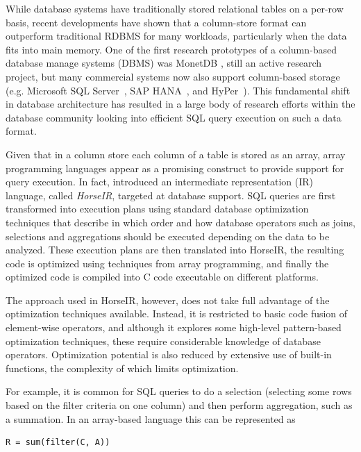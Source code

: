 While database systems have traditionally stored relational tables on a per-row
basis, recent developments have shown that a column-store format can outperform
traditional RDBMS for many workloads, particularly when the data fits into
main memory.
One of the first research prototypes of a column-based database manage systems
(DBMS) was MonetDB \cite{IdreosS2012}, still an active research project, but
many commercial systems now also support column-based storage (e.g.
Microsoft SQL Server~\cite{msqlserver},
SAP HANA~\cite{FarberF2012}, and
HyPer~\cite{Neumann2011:HyPer}).
This fundamental shift in database architecture has resulted in a large body of
research efforts within the database community looking into efficient SQL query
execution on such a data format.

Given that in a column store each column of a table is stored as an array,
array programming languages appear as a promising construct to provide support
for query execution. In fact, \OldPaperAuthor introduced an intermediate
representation (IR) language, called \textit{HorseIR}, targeted at database
support.  SQL queries are first transformed into execution plans using
standard database optimization techniques that describe in which order and
how database operators such as joins, selections and aggregations should be
executed depending on the data to be analyzed. These execution plans are
then translated into HorseIR, the resulting code is optimized using
techniques from array programming, and finally the optimized code is
compiled into C code executable on different platforms.

The approach used in HorseIR, however, does not take full advantage of the
optimization techniques available. Instead, it is restricted to basic code
fusion of element-wise operators, and although it explores some high-level
pattern-based optimization techniques, these require considerable knowledge of
database operators.  Optimization potential is also reduced by extensive use of
built-in functions, the complexity of which limits optimization.

For example, it is common for SQL queries to do a selection (selecting some
rows based on the filter criteria on one column) and then perform aggregation,
such as a summation.  In an array-based language this can be represented as

\begin{small}
\begin{Verbatim}[xleftmargin=.3\columnwidth]
R = sum(filter(C, A))
\end{Verbatim}
\end{small}

